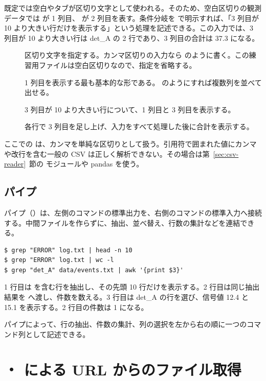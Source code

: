 既定では空白やタブが区切り文字として使われる。そのため、空白区切りの観測データでは  が 1 列目、 が 2 列目を表す。条件分岐を  で明示すれば、「3 列目が 10 より大きい行だけを表示する」という処理を記述できる。この入力では、3 列目が 10 より大きい行は det\_A の 2 行であり、3 列目の合計は 37.3 になる。

\begin{description}
\item[] 区切り文字を指定する。カンマ区切りの入力なら  のように書く。この練習用ファイルは空白区切りなので、指定を省略する。
\item[] 1 列目を表示する最も基本的な形である。 のようにすれば複数列を並べて出せる。
\item[] 3 列目が 10 より大きい行について、1 列目と 3 列目を表示する。
\item[] 各行で 3 列目を足し上げ、入力をすべて処理した後に合計を表示する。
\end{description}

ここでの  は、カンマを単純な区切りとして扱う。引用符で囲まれた値にカンマや改行を含む一般の CSV は正しく解析できない。その場合は第~\ref{sec:csv-reader}~節の  モジュールや pandas を使う。

\subsection{パイプ \code{|}}

パイプ（\code{|}）は、左側のコマンドの標準出力を、右側のコマンドの標準入力へ接続する。中間ファイルを作らずに、抽出、並べ替え、行数の集計などを連結できる。

\begin{lstlisting}[numbers=none, xleftmargin=2\zw]
$ grep "ERROR" log.txt | head -n 10
$ grep "ERROR" log.txt | wc -l
$ grep "det_A" data/events.txt | awk '{print $3}'
\end{lstlisting}

1 行目は  を含む行を抽出し、その先頭 10 行だけを表示する。2 行目は同じ抽出結果を  へ渡し、件数を数える。3 行目は det\_A の行を選び、信号値 12.4 と 15.1 を表示する。2 行目の件数は 1 になる。

パイプによって、行の抽出、件数の集計、列の選択を左から右の順に一つのコマンド列として記述できる。

\section{・ による URL からのファイル取得}

